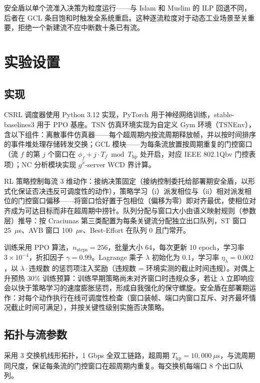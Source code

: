 \documentclass[UTF8]{ctexart}
\begin{document}
安全盾以单个流准入决策为粒度运行——与 Islam 和 Muslim 的 ILP 回退不同，后者在 GCL 条目饱和时触发全系统重启。这种逐流粒度对于动态工业场景至关重要，拒绝一个新建流不应中断数十条已有流。

\section{实验设置}

\subsection{实现}

CSRL 调度器使用 Python 3.12 实现，PyTorch 用于神经网络训练，stable-baselines3 用于 PPO 基座。TSN 仿真环境实现为自定义 Gym 环境（TSNEnv），含以下组件：离散事件仿真器——每个超周期内按流周期释放帧，并以按时间排序的事件堆处理存储转发交换；GCL 模块——为每条流放置按周期重复的门控窗口（流 $f$ 的第 $j$ 个窗口在 $\phi_f + j \cdot T_f \bmod T_{\text{hp}}$ 处开启，对应 IEEE 802.1Qbv 门控表项）；NC 分析模块实现 $g^x$-server WCD 界计算。

RL 策略控制每流 3 维动作：接纳决策固定（接纳控制委托给部署期安全盾，以形式化保证否决违反可调度性的动作），策略学习（i）派发相位与（ii）相对派发相位的门控窗口偏移——将窗口恰好置于包相位（偏移为零）即对齐最优，使相位对齐成为可达目标而非在超周期中捞针。队列分配与窗口大小由语义映射规则（参数层）推导：按 Craciunas 第三类配置为每条关键流分配独立出口队列，ST 窗口 25~$\mu$s、AVB 窗口 100~$\mu$s、Best-Effort 在队列 0 且门常开。

训练采用 PPO 算法，$n_{\text{steps}} = 256$，批量大小 64，每次更新 10 epoch，学习率 $3\times10^{-4}$，折扣因子 $\gamma = 0.99$。Lagrange 乘子 $\lambda$ 初始化为 0.1，学习率 $\eta_\lambda = 0.002$，以 $\lambda \cdot \text{违规数}$ 的惩罚项注入奖励（违规数 = 环境实测的截止时间违规）。对偶上升预热 30\% 训练预算：训练早期策略尚未对齐窗口时违规众多，若让 $\lambda$ 立即响应会以快于策略学习的速度膨胀惩罚，形成自我强化的保守螺旋。安全盾在部署期运作：对每个动作执行在线可调度性检查（窗口装帧、端口内窗口互斥、对齐最坏情况截止时间可满足），并按关键性级别实施否决策略。

\subsection{拓扑与流参数}

采用 3 交换机线形拓扑，1 Gbps 全双工链路，超周期 $T_{\text{hp}} = 10{,}000~\mu$s，与流周期同尺度，保证每条流的门控窗口在超周期内重复。每交换机每端口 8 个出口队列。
\end{document}
